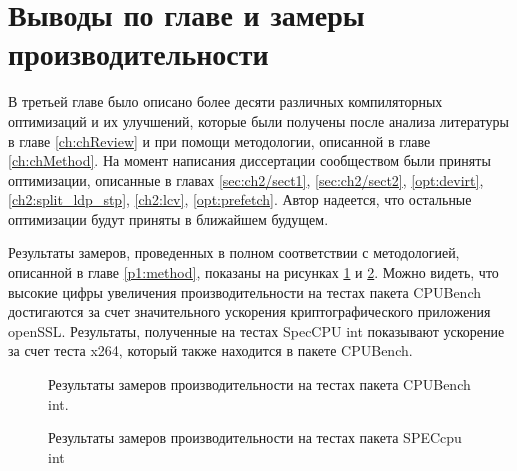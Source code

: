 \section{Выводы по главе и замеры производительности}  \label{results}
В третьей главе  было описано более десяти различных компиляторных оптимизаций и их улучшений, которые были получены после анализа литературы в главе \ref{ch:chReview} и при помощи методологии, описанной в главе \ref{ch:chMethod}. На момент написания диссертации сообществом были приняты оптимизации, описанные в главах \ref{sec:ch2/sect1}, \ref{sec:ch2/sect2}, \ref{opt:devirt}, \ref{ch2:split_ldp_stp}, \ref{ch2:lcv}, \ref{opt:prefetch}. Автор надеется, что остальные оптимизации будут приняты в ближайшем будущем.

Результаты замеров, проведенных в полном соответствии с методологией, описанной в главе \ref{p1:method}, показаны на рисунках \ref{fig:spubench_int_speedup} и \ref{fig:spec_int_speedup}. Можно видеть, что высокие цифры увеличения производительности на тестах пакета CPUBench достигаются за счет значительного ускорения криптографического приложения openSSL. Результаты, полученные на тестах SpecCPU int показывают ускорение за счет теста x264, который также находится в пакете CPUBench.

\begin{figure}[ht]
	\caption{Результаты замеров производительности на тестах  пакета CPUBench int.}\label{fig:spubench_int_speedup}
\end{figure}

\begin{figure}[ht]
	\caption{Результаты замеров производительности на тестах  пакета SPECcpu int}\label{fig:spec_int_speedup}
\end{figure}


